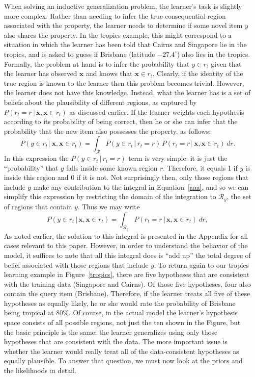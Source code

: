 \documentclass[doc]{apa6}
\newcommand{\p}{P}
\newcommand{\xn}{{\bm{x}}}
\newcommand{\rt}{{r_t}}
\newcommand{\condon}{\, | \,}
\newcommand{\pgap}{\,}
\begin{document}
When solving an inductive generalization problem, the learner's task is slightly more complex. Rather than needing to infer the true consequential region associated with the property, the learner needs to determine if some novel item $y$ also shares the property. In the tropics example, this might correspond to a situation in which the learner has been told that Cairns and Singapore lie in the tropics, and is asked to guess if Brisbane (latitude $-27.4^\circ$) also lies in the tropics. Formally, the problem at hand is to infer the probability that $y \in \rt$ given that the learner has observed $\xn$ and knows that $\xn \in \rt$. Clearly, if the identity of the true region is known to the learner then this problem becomes trivial. However, the learner does not have this knowledge. Instead, what the learner has is a set of beliefs about the plausibility of different regions, as captured by $P(\rt = r \condon  \bm{x}, \bm{x} \in \rt)$ as discussed earlier. If the learner weights each hypothesis according to its probability of being correct, then he or she can infer that the probability that the new item also possesses the property, as follows:
\begin{equation}
\p(y \in \rt \condon  \bm{x}, \bm{x} \in \rt) =  \int_{\mathcal{R}} \p(y \in \rt \condon  \rt=r) \pgap \p(\rt=r \condon  \bm{x}, \bm{x} \in \rt) \ dr. \label{aaa}
\end{equation}
In this expression the $\p(y \in \rt \condon  \rt=r)$ term is very simple: it is just the ``probability'' that $y$ falls inside some known region $r$. Therefore, it equals 1 if $y$ is inside this region and 0 if it is not. Not surprisingly then, only those regions that include $y$ make any contribution to the integral in Equation~\ref{aaa}, and so we can simplify this expression by restricting the domain of the integration to $\mathcal{R}_y$, the set of regions that contain $y$. Thus we may write
\begin{equation}
\p(y \in \rt \condon  \bm{x}, \bm{x} \in \rt) =  \int_{\mathcal{R}_y}\p(\rt=r \condon  \bm{x}, \bm{x} \in \rt) \ dr, \label{genint}
\end{equation}
As noted earlier, the solution to this integral is presented in the Appendix for all cases relevant to this paper. However, in order to understand the behavior of the model, it suffices to note that all this integral does is ``add up'' the total degree of belief associated with those regions that include $y$. To return again to our tropics learning example in Figure~\ref{tropics}, there are five hypotheses that are consistent with the training data (Singapore and Cairns). Of those five hypotheses, four also contain the query item (Brisbane). Therefore, if the learner treats all five of these hypotheses as equally likely, he or she would rate the probability of Brisbane being tropical at 80\%. Of course, in the actual model the learner's hypothesis space consists of all possible regions, not just the ten shown in the Figure, but the basic principle is the same: the learner generalizes using only those hypotheses that are consistent with the data. The more important issue is whether the learner would really treat all of the data-consistent hypotheses as equally plausible. To answer that question, we must now look at the priors and the likelihoods in detail.
\end{document}
